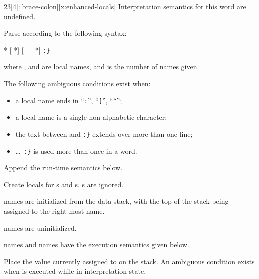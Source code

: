 \begin{worddef}[b:]{23}[4]{\brace:}[brace-colon][x:enhanced-locals]
\interpret
	Interpretation semantics for this word are undefined.

\compile

	Parse  according to the following syntax:
	\begin{center}
		 * [\textbf{\textbar} *] [\textbf{--\,--} *] \verb":}"
	\end{center}
	where ,  and  are local names, and
	 is the number of  names given.

	The following ambiguous conditions exist when:
	\begin{itemize}
	\item a local name ends in ``\verb":"'', ``\verb"["'', ``\verb"^"'';
	\item a local name is a single non-alphabetic character;
	\item the text between  and \texttt{:\}} extends
			over more than one line;
	\item {} \ldots\ \verb":}" is used more than once in a word.
	\end{itemize}

	Append the run-time semantics below. 

\runtime

	Create locals for s and s. s are ignored.

	\begin{list}{}{
		\setlength{\leftmargin}{2.6em}
		\setlength{\labelwidth}{2.4em}
	}
	\item[\arg{arg}] names are initialized from the data stack, with the
		top of the stack being assigned to the right most  name.

	\item[\arg{val}] names are uninitialized.
	\end{list}

	 names and  names have the execution semantics
		given below.

\execute[name]

	Place the value currently assigned to  on the stack.
	An ambiguous condition exists when  is executed while
	in interpretation state.



\end{worddef}
